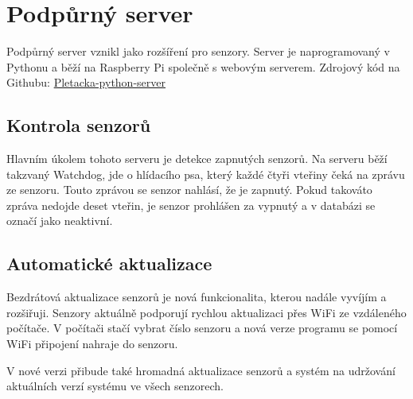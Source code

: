 \chapter{Podpůrný server}
Podpůrný server vznikl jako rozšíření pro senzory.
Server je naprogramovaný v Pythonu a běží na Raspberry Pi společně s webovým serverem.\newline
Zdrojový kód na Githubu: \href{https://github.com/Pletacka-IoT/Pletacka-python-server}{Pletacka-python-server}\cite{PL_PY}


\section{Kontrola senzorů}
Hlavním úkolem tohoto serveru je detekce zapnutých senzorů.
Na serveru běží takzvaný Watchdog, jde o hlídacího psa, který každé čtyři vteřiny čeká na zprávu ze senzoru.
Touto zprávou se senzor nahlásí, že je zapnutý. Pokud takováto zpráva nedojde deset vteřin, je senzor prohlášen za vypnutý a v databázi se označí jako neaktivní.


\section{Automatické aktualizace}
Bezdrátová aktualizace senzorů je nová funkcionalita, kterou nadále vyvíjím a rozšiřuji.
Senzory aktuálně podporují rychlou aktualizaci přes WiFi ze vzdáleného počítače.
V počítači stačí vybrat číslo senzoru a nová verze programu se pomocí WiFi připojení nahraje do senzoru.

V nové verzi přibude také hromadná aktualizace senzorů a systém na udržování aktuálních verzí systému ve všech senzorech.




\newpage